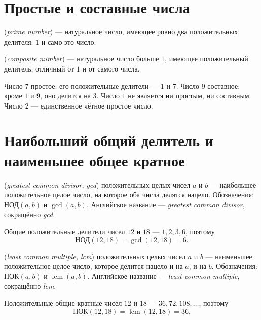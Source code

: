 \section{Простые и составные числа}

\begin{definition}
 (\emph{prime number}) --- натуральное число, имеющее ровно два положительных делителя:
\(1\) и само это число.
\end{definition}

\begin{definition}
 (\emph{composite number}) --- натуральное число больше \(1\), имеющее положительный делитель,
отличный от \(1\) и от самого числа.
\end{definition}

Число \(7\) простое: его положительные делители --- \(1\) и \(7\).
Число \(9\) составное: кроме \(1\) и \(9\), оно делится на \(3\).
Число \(1\) не является ни простым, ни составным.
Число \(2\) --- единственное чётное простое число.

\section{Наибольший общий делитель и наименьшее общее кратное}

\begin{definition}
 (\emph{greatest common divisor, gcd}) положительных целых чисел \(a\) и \(b\) ---
наибольшее положительное целое число, на которое оба числа делятся нацело.
Обозначения: \(\text{НОД}(a,b)\) и \(\gcd(a,b)\).
Английское название --- \emph{greatest common divisor}, сокращённо \emph{gcd}.
\end{definition}

Общие положительные делители чисел \(12\) и \(18\) --- \(1,2,3,6\), поэтому
\[
\text{НОД}(12,18)=\gcd(12,18)=6.
\]

\begin{definition}
 (\emph{least common multiple, lcm}) положительных целых чисел \(a\) и \(b\) ---
наименьшее положительное целое число, которое делится нацело и на \(a\), и на \(b\).
Обозначения: \(\text{НОК}(a,b)\) и \(\operatorname{lcm}(a,b)\).
Английское название --- \emph{least common multiple}, сокращённо \emph{lcm}.
\end{definition}

Положительные общие кратные чисел \(12\) и \(18\) --- \(36,72,108,\ldots\), поэтому
\[
\text{НОК}(12,18)=\operatorname{lcm}(12,18)=36.
\]

